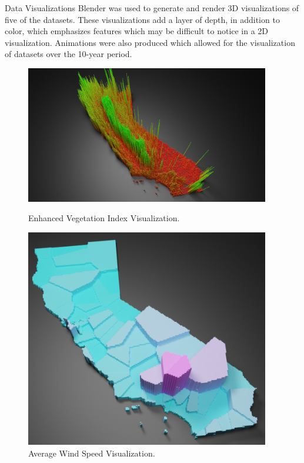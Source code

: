 \documentclass[final]{beamer}
\newlength{\colwidth}
\begin{document}
\begin{frame}[t]
\begin{columns}[t]
\begin{column}{\colwidth}
\begin{block}{Data Visualizations}
    Blender was used to generate and render 3D visualizations of five of the datasets. These visualizations add a layer of depth, in addition to color, which emphasizes features which may be difficult to notice in a 2D visualization. Animations were also produced which allowed for the visualization of datasets over the 10-year period.
    \vspace{1cm}
    \begin{figure}
        \centering
        \begin{minipage}{0.5\textwidth}
            \centering
            \includegraphics[width=0.95\textwidth]{images/CAEVI.png}
            \caption{Enhanced Vegetation Index Visualization.}
            \label{fig:CAEVI.png}
        \end{minipage}%
        \begin{minipage}{0.5\textwidth}
            \centering
            \includegraphics[width=0.95\textwidth]{images/wind.png}
            \caption{Average Wind Speed Visualization.}
            \label{fig:wind.png}
        \end{minipage}
    \end{figure}


\end{block}
\end{column}
\end{columns}
\end{frame}
\end{document}
